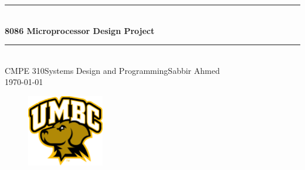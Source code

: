 \begin{titlepage}

    \newcommand{\HRule}{\rule{\linewidth}{0.6mm}}

    \center

    \HRule \\[1.5cm]
    {\huge \bfseries 8086 Microprocessor Design Project}\\[0.5cm]
    \HRule \\[4.5cm]

    \large{CMPE 310\linebreak Systems Design and Programming\linebreak Sabbir Ahmed}\\[3cm]

    {\large \today}\\[2cm]

    \begin{figure}[h]
        \begin{center}
            \includegraphics[width=0.3\textwidth]{figures/uni_logo.jpg}
            \label{fig:uni_logo}
        \end{center}
    \end{figure}

    \vfill %

\end{titlepage}
